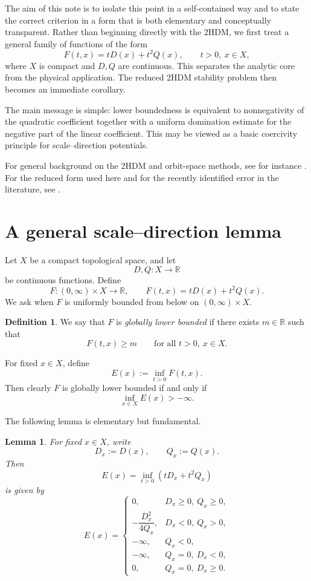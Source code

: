 \documentclass[11pt,a4paper]{article}
\newtheorem{lemma}[theorem]{Lemma}
\theoremstyle{definition}
\newtheorem{definition}[theorem]{Definition}
\theoremstyle{remark}
\begin{document}
The aim of this note is to isolate this point in a self-contained way and to state the correct criterion in a form that is both elementary and conceptually transparent. Rather than beginning directly with the 2HDM, we first treat a general family of functions of the form
\[
F(t,x)=tD(x)+t^2Q(x),
\qquad t>0,\ x\in X,
\]
where $X$ is compact and $D,Q$ are continuous. This separates the analytic core from the physical application. The reduced 2HDM stability problem then becomes an immediate corollary.

The main message is simple: lower boundedness is equivalent to nonnegativity of the quadratic coefficient together with a uniform domination estimate for the negative part of the linear coefficient. This may be viewed as a basic coercivity principle for scale--direction potentials.

For general background on the 2HDM and orbit-space methods, see for instance \citet{Branco2012,Ivanov2007,Ivanov2008}. For the reduced form used here and for the recently identified error in the literature, see \citet{Maniatis2006,ToobySmith2026}.

\section{A general scale--direction lemma}

Let $X$ be a compact topological space, and let
\[
D,Q:X\to\mathbb{R}
\]
be continuous functions. Define
\[
F:(0,\infty)\times X\to\mathbb{R},
\qquad
F(t,x)=tD(x)+t^2Q(x).
\]
We ask when $F$ is uniformly bounded from below on $(0,\infty)\times X$.

\begin{definition}\label{def:global-lower-bounded}
We say that $F$ is \emph{globally lower bounded} if there exists $m\in\mathbb{R}$ such that
\[
F(t,x)\ge m
\qquad\text{for all }t>0,\ x\in X.
\]
\end{definition}

For fixed $x\in X$, define
\begin{equation}\label{eq:effective-energy-general}
E(x):=\inf_{t>0}F(t,x).
\end{equation}
Then clearly $F$ is globally lower bounded if and only if
\[
\inf_{x\in X}E(x)>-\infty.
\]

The following lemma is elementary but fundamental.

\begin{lemma}\label{lem:pointwise-minimization}
For fixed $x\in X$, write
\[
D_x:=D(x),\qquad Q_x:=Q(x).
\]
Then
\[
E(x)=\inf_{t>0}(tD_x+t^2Q_x)
\]
is given by
\[
E(x)=
\begin{cases}
0, & D_x\ge 0,\ Q_x\ge 0,\\[1ex]
-\dfrac{D_x^2}{4Q_x}, & D_x<0,\ Q_x>0,\\[2ex]
-\infty, & Q_x<0,\\[1ex]
-\infty, & Q_x=0,\ D_x<0,\\[1ex]
0, & Q_x=0,\ D_x\ge 0.
\end{cases}
\]
\end{lemma}
\end{document}

